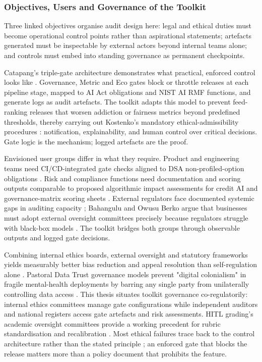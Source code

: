 \documentclass[11pt]{article}
\begin{document}
\subsubsection{Objectives, Users and Governance of the Toolkit}
\label{sec:toolkit_objectives_users_governance} Three linked objectives organise audit design here: legal and ethical duties must become operational control points rather than aspirational statements; artefacts generated must be inspectable by external actors beyond internal teams alone; and controls must embed into standing governance as permanent checkpoints.

Catapang's triple-gate architecture demonstrates what practical, enforced control looks like \parencites[24]{8367105}. Governance, Metric and Eco gates block or throttle releases at each pipeline stage, mapped to AI Act obligations and NIST AI RMF functions, and generate logs as audit artefacts. The toolkit adapts this model to prevent feed-ranking releases that worsen addiction or fairness metrics beyond predefined thresholds, thereby carrying out Kostenko's mandatory ethical-admissibility procedures \parencites[9]{2977039}: notification, explainability, and human control over critical decisions. Gate logic is the mechanism; logged artefacts are the proof.

Envisioned user groups differ in what they require. Product and engineering teams need CI/CD-integrated gate checks aligned to DSA non-profiled-option obligations \parencites[12]{6502223}. Risk and compliance functions need documentation and scoring outputs comparable to proposed algorithmic impact assessments for credit AI \parencites[15]{5442231} and governance-matrix scoring sheets \parencites[59]{2702055}. External regulators face documented systemic gaps in auditing capacity \parencites[9]{2977039}; Bahangulu and Owusu Berko argue that businesses must adopt external oversight committees precisely because regulators struggle with black-box models \parencites[8]{7461574}[9]{7461574}. The toolkit bridges both groups through observable outputs and logged gate decisions.

Combining internal ethics boards, external oversight and statutory frameworks yields measurably better bias reduction and appeal resolution than self-regulation alone \parencites[2]{0375818}. Pastoral Data Trust governance models prevent "digital colonialism" in fragile mental-health deployments by barring any single party from unilaterally controlling data access \parencites[11]{5419804}[13]{5419804}. This thesis situates toolkit governance co-regulatorily: internal ethics committees manage gate configurations while independent auditors and national registers access gate artefacts and risk assessments. HITL grading's academic oversight committees provide a working precedent for rubric standardisation and recalibration \parencites[21]{6805789}. Most ethical failures trace back to the control architecture rather than the stated principle \parencites[24]{8367105}[9]{7461574}[12]{6502223}[26]{2977039}; an enforced gate that blocks the release matters more than a policy document that prohibits the feature.
\end{document}
